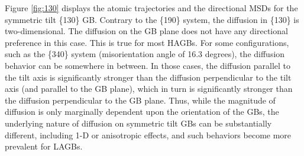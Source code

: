 \documentclass{elsarticle}
\begin{document}
Figure \ref{fig:130} displays the atomic trajectories and the directional MSDs for the symmetric tilt \{130\} GB. Contrary to the \{190\} system, the diffusion in \{130\} is two-dimensional. The diffusion on the GB plane does not have any directional preference in this case. This is true for most HAGBs. For some configurations, such as the \{340\} system (misorientation angle of 16.3 degrees), the diffusion behavior can be somewhere in between. In those cases, the diffusion parallel to the tilt axis is significantly stronger than the diffusion perpendicular to the tilt axis (and parallel to the GB plane), which in turn is significantly stronger than the diffusion perpendicular to the GB plane. Thus, while the magnitude of diffusion is only marginally dependent upon the orientation of the GBs, the underlying nature of diffusion on symmetric tilt GBs can be substantially different, including 1-D or anisotropic effects, and such behaviors become more prevalent for LAGBs. 
\end{document}

